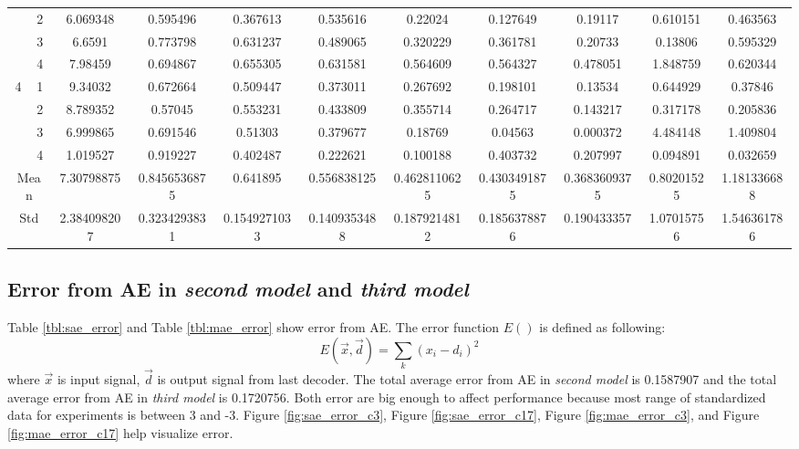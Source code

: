 \documentclass[draft,dvipsnames]{drexel-thesis}
\begin{document}
\begin{thesis}
\begin{table}[!t]
{\begin{tabular}{|c|c|c|c|c|c|c|c|c|c|c|}
                      & 2                   & 6.069348    & 0.595496     & 0.367613     & 0.535616     & 0.22024      & 0.127649     & 0.19117      & 0.610151   & 0.463563    \\ \cline{2-11}
                      & 3                   & 6.6591      & 0.773798     & 0.631237     & 0.489065     & 0.320229     & 0.361781     & 0.20733      & 0.13806    & 0.595329    \\ \cline{2-11}
                      & 4                   & 7.98459     & 0.694867     & 0.655305     & 0.631581     & 0.564609     & 0.564327     & 0.478051     & 1.848759   & 0.620344    \\ \hline
\multirow{4}{*}{4}    & 1                   & 9.34032     & 0.672664     & 0.509447     & 0.373011     & 0.267692     & 0.198101     & 0.13534      & 0.644929   & 0.37846     \\ \cline{2-11}
                      & 2                   & 8.789352    & 0.57045      & 0.553231     & 0.433809     & 0.355714     & 0.264717     & 0.143217     & 0.317178   & 0.205836    \\ \cline{2-11}
                      & 3                   & 6.999865    & 0.691546     & 0.51303      & 0.379677     & 0.18769      & 0.04563      & 0.000372     & 4.484148   & 1.409804    \\ \cline{2-11}
                      & 4                   & 1.019527    & 0.919227     & 0.402487     & 0.222621     & 0.100188     & 0.403732     & 0.207997     & 0.094891   & 0.032659    \\ \hline
\multicolumn{2}{|c|}{Mean}                  & 7.30798875  & 0.8456536875 & 0.641895     & 0.556838125  & 0.4628110625 & 0.4303491875 & 0.3683609375 & 0.80201525 & 1.181336688 \\ \hline
\multicolumn{2}{|c|}{Std}                   & 2.384098207 & 0.3234293831 & 0.1549271033 & 0.1409353488 & 0.1879214812 & 0.1856378876 & 0.190433357  & 1.07015756 & 1.546361786 \\ \hline
\end{tabular}}
\end{table}

\subsection{Error from AE in {\em second model} and {\em third model}}
Table \ref{tbl:sae_error} and Table \ref{tbl:mae_error} show error from AE. The error function $E()$ is defined as following:
$$E(\vec{x}, \vec{d})=\sum_k(x_i-d_i)^2$$
where $\vec{x}$ is input signal, $\vec{d}$ is output signal from last decoder. The total average error from AE in {\em second model} is 0.1587907 and the total average error from AE in {\em third model} is 0.1720756. Both error are big enough to affect performance because most range of standardized data for experiments is between 3 and -3. Figure \ref{fig:sae_error_c3}, Figure \ref{fig:sae_error_c17}, Figure \ref{fig:mae_error_c3}, and Figure \ref{fig:mae_error_c17} help visualize error.


\end{thesis}
\end{document}

